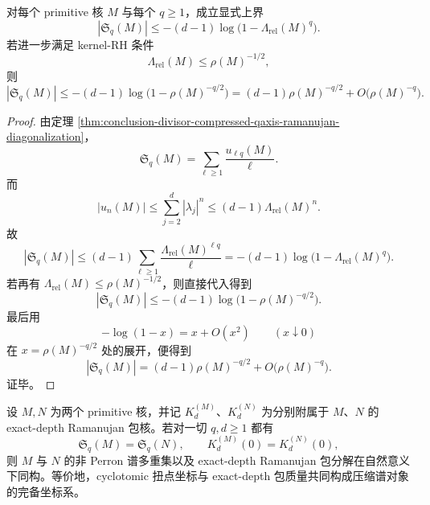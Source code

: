 \begin{proposition}\label{prop:conclusion-divisor-compressed-qaxis-sqrt-threshold-visible}
对每个 primitive 核 \(M\) 与每个 \(q\ge 1\)，成立显式上界
\[
|\mathfrak S_q(M)|
\le
-(d-1)\log\!\bigl(1-\Lambda_{\mathrm{rel}}(M)^q\bigr).
\]
若进一步满足 kernel-RH 条件
\[
\Lambda_{\mathrm{rel}}(M)\le \rho(M)^{-1/2},
\]
则
\[
|\mathfrak S_q(M)|
\le
-(d-1)\log\!\bigl(1-\rho(M)^{-q/2}\bigr)
=(d-1)\rho(M)^{-q/2}+O\bigl(\rho(M)^{-q}\bigr).
\]
\end{proposition}
\begin{proof}
由定理 \ref{thm:conclusion-divisor-compressed-qaxis-ramanujan-diagonalization}，
\[
\mathfrak S_q(M)=\sum_{\ell\ge 1}\frac{u_{\ell q}(M)}{\ell}.
\]
而
\[
|u_n(M)|
\le
\sum_{j=2}^d|\lambda_j|^n
\le
(d-1)\Lambda_{\mathrm{rel}}(M)^n.
\]
故
\[
|\mathfrak S_q(M)|
\le
(d-1)\sum_{\ell\ge 1}\frac{\Lambda_{\mathrm{rel}}(M)^{\ell q}}{\ell}
=
-(d-1)\log\!\bigl(1-\Lambda_{\mathrm{rel}}(M)^q\bigr).
\]
若再有 \(\Lambda_{\mathrm{rel}}(M)\le \rho(M)^{-1/2}\)，则直接代入得到
\[
|\mathfrak S_q(M)|
\le
-(d-1)\log\!\bigl(1-\rho(M)^{-q/2}\bigr).
\]
最后用
\[
-\log(1-x)=x+O(x^2)\qquad (x\downarrow 0)
\]
在 \(x=\rho(M)^{-q/2}\) 处的展开，便得到
\[
|\mathfrak S_q(M)|
=(d-1)\rho(M)^{-q/2}+O\bigl(\rho(M)^{-q}\bigr).
\]
证毕。
\end{proof}

\begin{conjecture}[\(q\)-轴与深度包质量的双坐标完备性]\label{conj:conclusion-divisor-qaxis-depth-completeness}
设 \(M,N\) 为两个 primitive 核，并记 \(K_d^{(M)}\)、\(K_d^{(N)}\) 为分别附属于 \(M\)、\(N\) 的 exact-depth Ramanujan 包核。若对一切 \(q,d\ge 1\) 都有
\[
\mathfrak S_q(M)=\mathfrak S_q(N),
\qquad
K_d^{(M)}(0)=K_d^{(N)}(0),
\]
则 \(M\) 与 \(N\) 的非 Perron 谱多重集以及 exact-depth Ramanujan 包分解在自然意义下同构。等价地，cyclotomic 扭点坐标与 exact-depth 包质量共同构成压缩谱对象的完备坐标系。
\end{conjecture}
